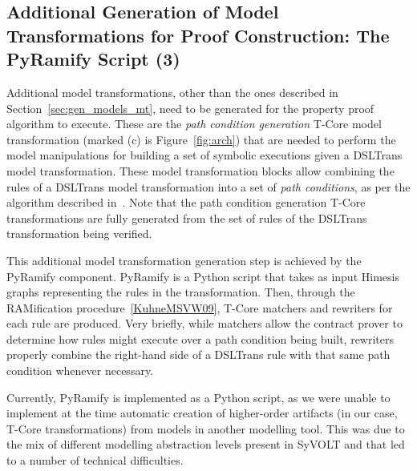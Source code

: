 

\subsection{Additional Generation of Model Transformations for Proof
Construction: The PyRamify Script (3)}

Additional model transformations, other than the ones described in
Section~\ref{sec:gen_models_mt}, need to be generated for the property proof
algorithm to execute. These are the \emph{path condition generation} T-Core
model transformation (marked (c) is Figure~\ref{fig:arch}) that are
needed to perform the model manipulations for building a set of symbolic
executions given a DSLTrans model transformation. These model transformation
blocks allow combining the rules of a DSLTrans model
transformation into a set of \emph{path conditions}, as per the algorithm
described in~\cite{Lucio2014}. Note that the path condition generation T-Core
transformations are fully generated from the set of rules of the DSLTrans
transformation being verified.

This additional model transformation generation step is achieved by the PyRamify
component. PyRamify is a Python script that
takes as input Himesis graphs representing the rules in the transformation.
Then, through the RAMification procedure~\ref{KuhneMSVW09}, T-Core matchers and
rewriters for each rule are produced. Very briefly, while matchers allow the
contract prover to determine how rules might execute over a path condition being
built, rewriters properly combine the right-hand side of a DSLTrans rule with
that same path condition whenever necessary.


Currently, PyRamify is implemented as a Python script, as we were unable to
implement at the time automatic creation of higher-order artifacts (in our
case, T-Core transformations) from models in another modelling tool.
This was due to the mix of different modelling abstraction levels present in
SyVOLT and that led to a number of technical difficulties.

